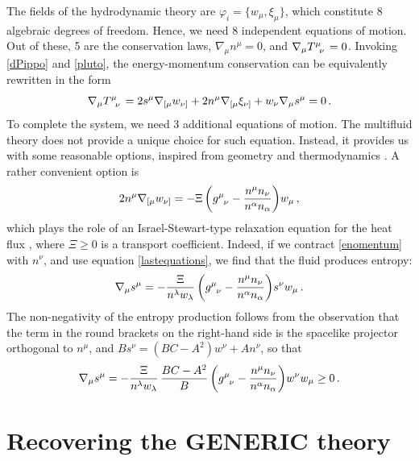\documentclass[a4paper, amsfonts, amssymb, amsmath, reprint, showkeys, nofootinbib, twoside, onecolumn, notitlepage]{revtex4-1}
\begin{document}
The fields of the hydrodynamic theory are $\varphi_i=\{w_\mu,\xi_\mu \}$, which constitute 8 algebraic degrees of freedom. Hence, we need 8 independent equations of motion. Out of these, 5 are the conservation laws, $\nabla_\mu n^\mu=0$, and $\nabla_\mu T\indices{^\mu _\nu}=0$. Invoking \eqref{dPippo} and \eqref{pluto}, the energy-momentum conservation can be equivalently rewritten in the form \cite{Carter_starting_point}
\begin{equation}\label{enomentum}
\nabla_\mu T\indices{^\mu _\nu}=2s^\mu \nabla_{[\mu} w_{\nu]}+2n^\mu \nabla_{[\mu}\xi_{\nu]}+w_\nu \nabla_\mu s^\mu=0 \, .
\end{equation}
To complete the system, we need 3 additional equations of motion. The multifluid theory does not provide a unique choice for such equation. Instead, it provides us with some reasonable options, inspired from geometry and thermodynamics \cite{noto_rel,Lopez09,GavassinoRadiazione,GavassinoKhalatnikov2022}. A rather convenient option is
\begin{equation}\label{lastequations}
2n^\mu \nabla_{[\mu}w_{\nu]} = -\Xi \, \bigg(g\indices{^\mu _\nu} - \dfrac{n^\mu n_\nu}{n^\alpha n_\alpha} \bigg) w_\mu \, ,
\end{equation}
which plays the role of an Israel-Stewart-type relaxation equation for the heat flux \cite{GavassinoKhalatnikov2022}, where $\Xi \geq 0$ is a transport coefficient.
Indeed, if we contract \eqref{enomentum} with $n^\nu$, and use equation \eqref{lastequations}, we find that the fluid produces entropy:
\begin{equation}\label{lastequations2}
 \nabla_\mu s^\mu = -\dfrac{\Xi}{n^\lambda w_\lambda} \, \bigg(g\indices{^\mu _\nu} - \dfrac{n^\mu n_\nu}{n^\alpha n_\alpha}  \bigg)s^\nu w_\mu  \, .
\end{equation}
The non-negativity of the entropy production follows from the observation that the term in the round brackets on the right-hand side is the spacelike projector orthogonal to $n^\mu$, and $Bs^\nu=(BC-A^2)w^\nu+An^\nu$, so that
\begin{equation}
   \nabla_\mu s^\mu = -\dfrac{\Xi}{n^\lambda w_\lambda} \, \dfrac{BC-A^2}{B} \, \bigg(g\indices{^\mu _\nu} - \dfrac{n^\mu n_\nu}{n^\alpha n_\alpha}  \bigg)w^\nu w_\mu \geq 0 \, .
\end{equation}







\section{Recovering the GENERIC theory}\label{RGH}
\end{document}
